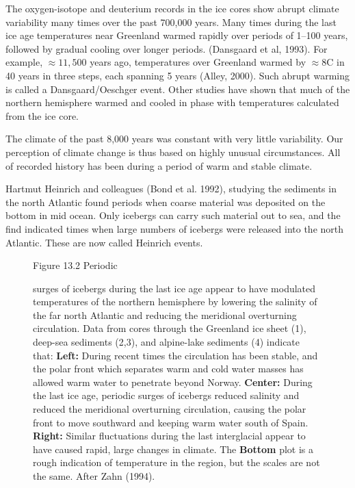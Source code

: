 \begin{enumerate}
\vitem The oxygen-isotope and deuterium records in the ice cores show
abrupt climate variability many times over the past 700,000
years. Many times during the last ice age temperatures near Greenland
warmed rapidly over periods of 1--100 years, followed by gradual
cooling over longer periods. (Dansgaard et al, 1993). For example,
$\approx 11,500$ years ago, temperatures over Greenland warmed by
$\approx 8$\degrees C in 40 years in three steps, each spanning 5
years (Alley, 2000). Such abrupt warming is called a
Dansgaard/Oeschger event. Other
studies have shown that much of the northern hemisphere warmed and
cooled in phase with temperatures calculated from the ice core.

\vitem The climate of the past 8,000 years was constant with very
little variability. Our perception of climate change is thus based on
highly unusual circumstances. All of recorded history has been during
a period of warm and stable climate.

\vitem Hartmut Heinrich and colleagues (Bond et al. 1992), studying
the sediments in the north Atlantic found periods when coarse material
was deposited on the bottom in mid ocean. Only icebergs can carry such
material out to sea, and the find indicated times when large numbers
of icebergs were released into the north Atlantic. These are now
called Heinrich events.

\begin{figure}[t!]
\footnotesize
Figure 13.2 Periodic \rule{0mm}{3ex}surges of icebergs during the last
ice age appear to have modulated temperatures of the northern
hemisphere by lowering the salinity of the far north Atlantic and
reducing the meridional overturning
circulation. Data from cores
through the Greenland ice sheet (1), deep-sea sediments (2,3), and
alpine-lake sediments (4) indicate that: \textbf{Left:} During recent
times the circulation has been stable, and the polar front which
separates warm and cold water masses has allowed warm water to
penetrate beyond Norway.  \textbf{Center:} During the last ice age,
periodic surges of icebergs reduced salinity and reduced the
meridional overturning circulation, causing the polar front to move
southward and keeping warm water south of Spain.  \textbf{Right:}
Similar fluctuations during the last interglacial appear to have
caused rapid, large changes in climate. The \textbf{Bottom} plot is a
rough indication of temperature in the region, but the scales are not
the same. After Zahn (1994).
\label{fig:NAiceage}
\vspace{-3ex}
\end{figure}


\end{enumerate}
